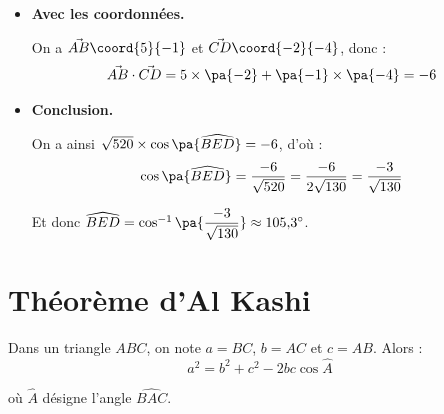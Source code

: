 \begin{methode}
\begin{correction}
\begin{itemize}
			      Or $\norm{\vec{AB}} = \sqrt{5^2 + \pa{-1}^2} = \sqrt{26}$ et $\norm{\vec{CD}} = \sqrt{\pa{-2}^2 + \pa{-4}^2} = \sqrt{20}$. Donc :
			      \[
				      \begin{array}{rcl}
					      \vec{AB}\cdot\vec{CD} & = & \sqrt{26} \times \sqrt{20} \times \cos\pa{\widehat{BED}} \\
					                            & = & \sqrt{520} \times \cos\pa{\widehat{BED}}
				      \end{array}
			      \]

			\item \textbf{Avec les coordonnées.}

			      On a $\vec{AB}\coord{5}{-1}$ et $\vec{CD}\coord{-2}{-4}$, donc :
			      \[
				      \vec{AB}\cdot\vec{CD} = 5 \times \pa{-2} + \pa{-1} \times \pa{-4} = -6
			      \]

			\item \textbf{Conclusion.}

			      On a ainsi $\sqrt{520} \times \cos\pa{\widehat{BED}} = -6$, d'où :
			      \[
				      \cos\pa{\widehat{BED}} = \dfrac{-6}{\sqrt{520}} = \dfrac{-6}{2\sqrt{130}} = \dfrac{-3}{\sqrt{130}}
			      \]

			      Et donc $\widehat{BED} = \cos^{-1}\pa{\dfrac{-3}{\sqrt{130}}} \approx 105{,}3^\circ$.
		\end{itemize}
	\end{correction}
\end{methode}

\section{Théorème d'Al Kashi}

\begin{thm}
	Dans un triangle $ABC$, on note $a = BC$, $b = AC$ et $c = AB$. Alors :
	\[
		a^2 = b^2 + c^2 - 2bc\cos\widehat{A}
	\]

	où $\widehat{A}$ désigne l'angle $\widehat{BAC}$.
\end{thm}


